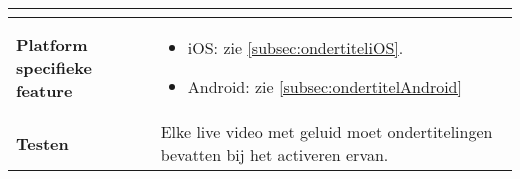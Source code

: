\begin{table}[H]
\begin{tabular}{|l|p{12cm}|}
\begin{itemize}
        \end{itemize}                                                                                                                   \\ 
        \hline
        \textbf{Platform specifieke feature} & \begin{itemize}
            \item iOS: zie \ref{subsec:ondertiteliOS}.
            \item Android: zie \ref{subsec:ondertitelAndroid}
        \end{itemize}                                                                                                                                                                       \\ 
        \hline
        \textbf{Testen}                      & Elke live video met geluid moet ondertitelingen bevatten bij het activeren ervan.                                                                                                                                                                                    \\
        \hline
    \end{tabular}
\end{table}


